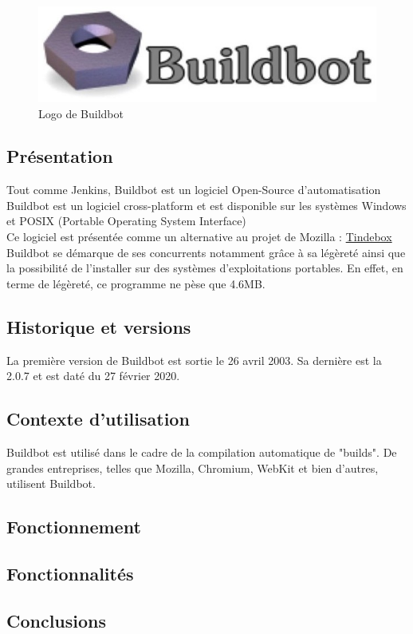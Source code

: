 \documentclass[12pt]{article}
\begin{document}
\begin{figure}[ht]
    \includegraphics[scale=0.7]{images/buildbot.jpg}
    \caption{Logo de Buildbot}
\end{figure}

\subsection{Présentation}
Tout comme Jenkins, Buildbot est un logiciel Open-Source d'automatisation
\\
Buildbot est un logiciel cross-platform et est disponible sur les systèmes Windows et POSIX (Portable Operating System Interface)
\\
Ce logiciel est présentée comme un alternative au projet de Mozilla : \underline{Tindebox}
\\
Buildbot se démarque de ses concurrents notamment grâce à sa légèreté ainsi que la possibilité de l'installer sur des systèmes d'exploitations portables. En effet, en terme de légèreté, ce programme ne pèse que 4.6MB.
\subsection{Historique et versions}
La première version de Buildbot est sortie le 26 avril 2003. Sa dernière est la 2.0.7 et est daté du 27 février 2020.
\subsection{Contexte d'utilisation}
Buildbot est utilisé dans le cadre de la compilation automatique de "builds". De grandes entreprises, telles que Mozilla, Chromium, WebKit et bien d'autres, utilisent Buildbot.
\subsection{Fonctionnement}
\subsection{Fonctionnalités}
\subsection{Conclusions}
\end{document}
